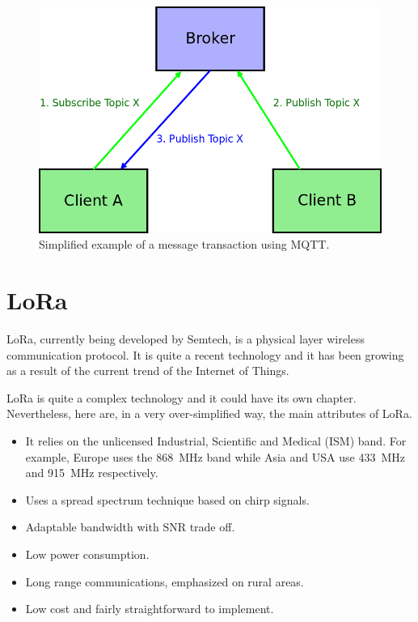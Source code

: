 \begin{figure}
  \centering
  \includegraphics[width=\linewidth]{imagenes/Technologies/mqtt.png}
  \caption{Simplified example of a message transaction using MQTT.}
  \label{fig:mqtt}
\end{figure}

\section{LoRa}
LoRa\cite{lora_website}, currently being developed by Semtech, is a physical layer wireless communication protocol. It is quite a recent technology and it has been growing as a result of the current trend of the Internet of Things.

LoRa is quite a complex technology and it could have its own chapter. Nevertheless, here are, in a very over-simplified way, the main attributes of LoRa.
\begin{itemize}
    \item It relies on the unlicensed Industrial, Scientific and Medical (ISM) band. For example, Europe uses the \SI{868}{\mega\hertz} band while Asia and USA use \SI{433}{\mega\hertz} and \SI{915}{\mega\hertz} respectively. 
    \item Uses a spread spectrum technique based on chirp signals.
    \item Adaptable bandwidth with SNR trade off.
    \item Low power consumption.
    \item Long range communications, emphasized on rural areas. 
    \item Low cost and fairly straightforward to implement.
\end{itemize}

